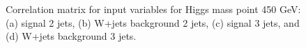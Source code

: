 \begin{figure}[bthp!]
{}


\caption{\label{fig:FigCorr450Mu} 
Correlation matrix for input variables for Higgs mass point 450 GeV:
(a) signal 2 jets, (b) W+jets background 2 jets, 
(c) signal 3 jets, and (d) W+jets background 3 jets.
}
\end{figure}
\newpage
